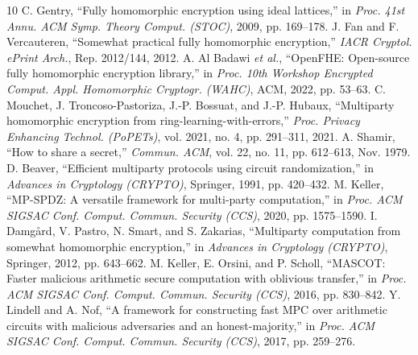 \documentclass[conference]{IEEEtran}
\begin{document}
\begin{thebibliography}{10}
 C. Gentry, ``Fully homomorphic encryption using ideal lattices,'' in \emph{Proc. 41st Annu. ACM Symp. Theory Comput. (STOC)}, 2009, pp. 169--178.
 J. Fan and F. Vercauteren, ``Somewhat practical fully homomorphic encryption,'' \emph{IACR Cryptol. ePrint Arch.}, Rep. 2012/144, 2012.
 A. Al Badawi \emph{et al.}, ``OpenFHE: Open-source fully homomorphic encryption library,'' in \emph{Proc. 10th Workshop Encrypted Comput. Appl. Homomorphic Cryptogr. (WAHC)}, ACM, 2022, pp. 53--63.
 C. Mouchet, J. Troncoso-Pastoriza, J.-P. Bossuat, and J.-P. Hubaux, ``Multiparty homomorphic encryption from ring-learning-with-errors,'' \emph{Proc. Privacy Enhancing Technol. (PoPETs)}, vol. 2021, no. 4, pp. 291--311, 2021.
 A. Shamir, ``How to share a secret,'' \emph{Commun. ACM}, vol. 22, no. 11, pp. 612--613, Nov. 1979.
 D. Beaver, ``Efficient multiparty protocols using circuit randomization,'' in \emph{Advances in Cryptology (CRYPTO)}, Springer, 1991, pp. 420--432.
 M. Keller, ``MP-SPDZ: A versatile framework for multi-party computation,'' in \emph{Proc. ACM SIGSAC Conf. Comput. Commun. Security (CCS)}, 2020, pp. 1575--1590.
 I. Damg{\aa}rd, V. Pastro, N. Smart, and S. Zakarias, ``Multiparty computation from somewhat homomorphic encryption,'' in \emph{Advances in Cryptology (CRYPTO)}, Springer, 2012, pp. 643--662.
 M. Keller, E. Orsini, and P. Scholl, ``MASCOT: Faster malicious arithmetic secure computation with oblivious transfer,'' in \emph{Proc. ACM SIGSAC Conf. Comput. Commun. Security (CCS)}, 2016, pp. 830--842.
 Y. Lindell and A. Nof, ``A framework for constructing fast MPC over arithmetic circuits with malicious adversaries and an honest-majority,'' in \emph{Proc. ACM SIGSAC Conf. Comput. Commun. Security (CCS)}, 2017, pp. 259--276.
\end{thebibliography}
\end{document}
